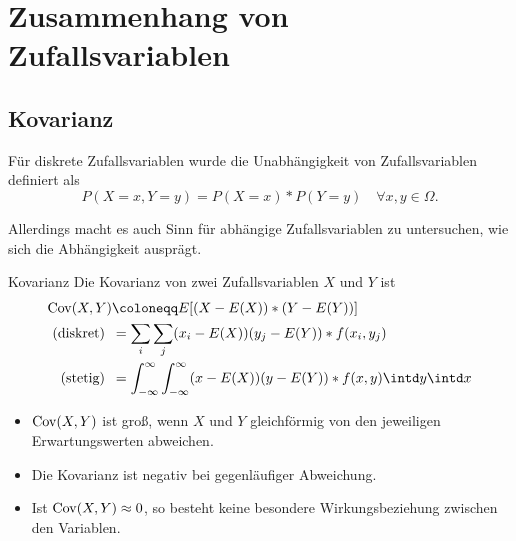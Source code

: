 \chapter{Zusammenhang von Zufallsvariablen}
\section{Kovarianz}
Für diskrete Zufallsvariablen wurde die Unabhängigkeit von Zufallsvariablen definiert als
\begin{equation*}
	P(X=x,Y=y)=P(X=x)*P(Y=y)\quad\forall x,y\in\Omega.
\end{equation*}

Allerdings macht es auch Sinn für abhängige Zufallsvariablen zu untersuchen, wie sich die Abhängigkeit ausprägt.

\begin{definition}{Kovarianz}
	Die Kovarianz von zwei Zufallsvariablen $X$ und $Y$ ist
	\begin{align*}
		\cov(X,Y)&\coloneqq E[(X-E(X))*(Y-E(Y))]\\
		\text{(diskret)}\enspace&=\sum_i\sum_j (x_i-E(X))(y_j-E(Y))*f(x_i,y_j)\\
		\text{(stetig)}\enspace&=\int_{-\infty}^\infty\int_{-\infty}^\infty (x-E(X))(y-E(Y))*f(x,y)\intd y\intd x
	\end{align*}
\end{definition}
\begin{itemize}
	\item $\operatorname{Cov}(X,Y)$ ist groß, wenn $X$ und $Y$ gleichförmig von den jeweiligen Erwartungswerten abweichen.
	\item Die Kovarianz ist negativ bei gegenläufiger Abweichung.
	\item Ist $\operatorname{Cov}(X,Y)\approx 0$, so besteht keine besondere Wirkungsbeziehung zwischen den Variablen.
\end{itemize}

